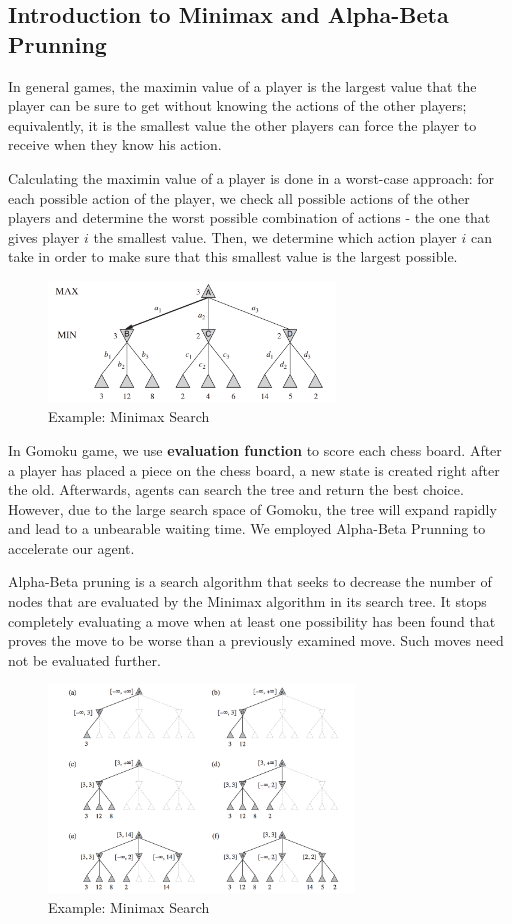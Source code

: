 \documentclass[12pt,a4paper]{article}
\begin{document}
\subsection{Introduction to Minimax and Alpha-Beta Prunning}

In general games, the maximin value of a player is the largest value that the player can be sure to get without knowing the actions of the other players; equivalently, it is the smallest value the other players can force the player to receive when they know his action.

Calculating the maximin value of a player is done in a worst-case approach: for each possible action of the player, we check all possible actions of the other players and determine the worst possible combination of actions - the one that gives player $i$ the smallest value. Then, we determine which action player $i$ can take in order to make sure that this smallest value is the largest possible.

\begin{figure}[!h]
\centering\includegraphics[width=3in]{3.png}
\caption{Example: Minimax Search}
\end{figure}

In Gomoku game, we use \textbf{evaluation function} to score each chess board. After a player has placed a piece on the chess board, a new state is created right after the old. Afterwards, agents can search the tree and return the best choice. However, due to the large search space of Gomoku, the tree will expand rapidly and lead to a unbearable waiting time. We employed Alpha-Beta Prunning to accelerate our agent.

Alpha-Beta pruning is a search algorithm that seeks to decrease the number of nodes that are evaluated by the Minimax algorithm in its search tree. It stops completely evaluating a move when at least one possibility has been found that proves the move to be worse than a previously examined move. Such moves need not be evaluated further.

\begin{figure}[!h]
\centering\includegraphics[width=3.2in]{4.png}
\caption{Example: Minimax Search}
\end{figure}
\end{document}
